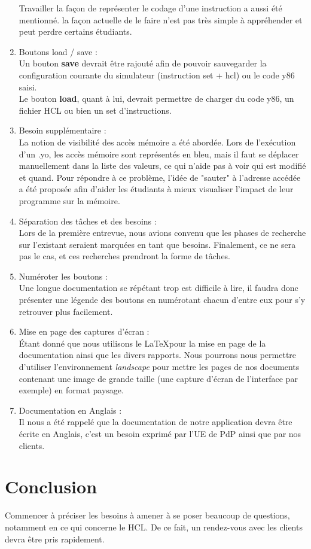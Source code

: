 \documentclass[french]{article}
\begin{document}
\begin{enumerate}
    Travailler la façon de représenter le codage d'une instruction a aussi été mentionné. la façon actuelle de le faire n'est pas très simple à appréhender et peut perdre certains étudiants.
    \\
    \item Boutons load / save :\\
    Un bouton \textbf{save} devrait être rajouté afin de pouvoir sauvegarder la configuration courante du simulateur (instruction set + hcl) ou le code y86 saisi.\\
    Le bouton \textbf{load}, quant à lui, devrait permettre de charger du code y86, un fichier HCL ou bien un set d'instructions.
    \\
    \item Besoin supplémentaire :\\
    La notion de visibilité des accès mémoire a été abordée. Lors de l'exécution d'un .yo, les accès mémoire sont représentés en bleu, mais il faut se déplacer manuellement dans la liste des valeurs, ce qui n'aide pas à voir qui est modifié et quand. Pour répondre à ce problème, l'idée de "sauter" à l'adresse accédée a été proposée afin d'aider les étudiants à mieux visualiser l'impact de leur programme sur la mémoire.
    \\
    \item Séparation des tâches et des besoins :\\
    Lors de la première entrevue, nous avions convenu que les phases de recherche sur l'existant seraient marquées en tant que besoins. Finalement, ce ne sera pas le cas, et ces recherches prendront la forme de tâches.
    \\
    \item Numéroter les boutons :\\
    Une longue documentation se répétant trop est difficile à lire, il faudra donc présenter une légende des boutons en numérotant chacun d'entre eux pour s'y retrouver plus facilement.
    \\
    \item Mise en page des captures d'écran :\\
    Étant donné que nous utilisons le \LaTeX pour la mise en page de la documentation ainsi que les divers rapports. Nous pourrons nous permettre d'utiliser l'environnement \textit{landscape} pour mettre les pages de nos documents contenant une image de grande taille (une capture d'écran de l'interface par exemple) en format paysage.
    \\
    \item Documentation en Anglais :\\
    Il nous a été rappelé que la documentation de notre application devra être écrite en Anglais, c'est un besoin exprimé par l'UE de PdP ainsi que par nos clients.
\end{enumerate}

\section{Conclusion}

Commencer à préciser les besoins à amener à se poser beaucoup de questions, notamment en ce qui concerne le HCL. De ce fait, un rendez-vous avec les clients devra être pris rapidement.
\end{document}
